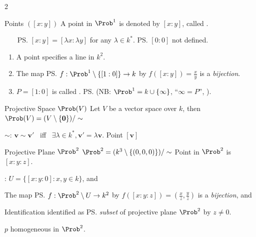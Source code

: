 \documentclass{note}
\begin{document}
\begin{multicols}{2}
    \begin{MyTh}{Points $([x:y])$}
        A point in $\Prob^1$ is denoted by $[x:y]$, called .

        \ \ \  \ps{$[x:y]=[ \lambda x: \lambda y ]$ for any $\lambda \in k^*$.} \qquad {} \ps{$[0:0]$ not defined.}

        \begin{enumerate}
            \item A point  specifies a line  in $k^2$.
            \item The map \ps{$f: \Prob^1 \setminus \{[1:0]\} \to k$ by $f([x:y]) = \frac{x}{y}$} is a \textit{bijection}.
            \item $P=[1:0]$ is called . \quad \ps{(NB: \tiny $\Prob^1 = k \cup \{\infty\}$, ``$\infty=P$'', )}.
        \end{enumerate}
    \end{MyTh}

    \begin{MyTh}{Projective Space $\Prob(V)$}
        Let $V$ be a vector space over $k$, then $\Prob(V) = (V\setminus\{\mathbf{0}\})/\sim$

        \quad {} $\sim$: $\mathbf{v} \sim \mathbf{v'}$ \ iff \ $\exists \lambda \in k^*, \mathbf{v'}=\lambda \mathbf{v}$. \qquad
         \quad {} Point $[\mathbf{v}]$
    \end{MyTh}

    \begin{MyTh}{Projective Plane $\Prob^2$}
        $\Prob^2 = (k^3\setminus\{(0,0,0)\})/\sim$ \qquad Point in $\Prob^2$ is $[x:y:z]$.

        \quad {} : $U=\{[x:y:0]: x,y\in k\}$, and 

        \quad {} The map \ps{$f: \Prob^2 \setminus U \to k^2$ by $f([x:y:z]) = (\frac{x}{z}, \frac{y}{z})$} is a \textit{bijection}, and 

        \quad \begin{MyTh}{Identification}
                 identified as \ps{\textit{subset} of projective plane $\Prob^2$} by $z\neq 0$.
              \end{MyTh}
    \end{MyTh}

    \begin{MyTh}{}
        $p$ homogeneous in $\Prob^2$.


\end{MyTh}
\end{multicols}
\end{document}
